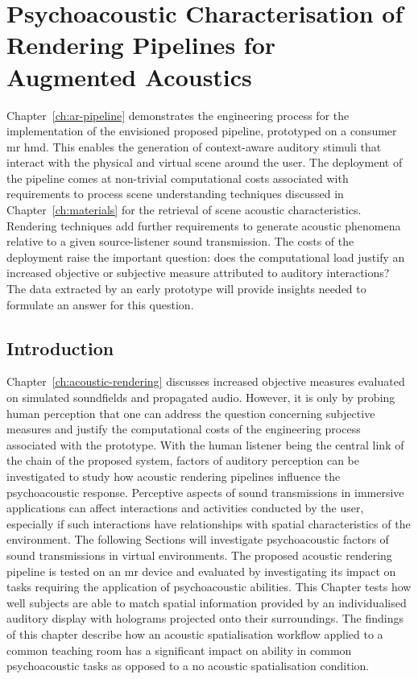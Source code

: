 \chapter{Psychoacoustic Characterisation of Rendering Pipelines for Augmented Acoustics}\label{ch:evaluation}
Chapter~\ref{ch:ar-pipeline} demonstrates the engineering process for the implementation of the envisioned proposed pipeline, prototyped on a consumer \acrshort{mr} \acrshort{hmd}. This enables the generation of context-aware auditory stimuli that interact with the physical and virtual scene around the user. The deployment of the pipeline comes at non-trivial computational costs associated with requirements to process scene understanding techniques discussed in Chapter~\ref{ch:materials} for the retrieval of scene acoustic characteristics. Rendering techniques add further requirements to generate acoustic phenomena relative to a given source-listener sound transmission. The costs of the deployment raise the important question: does the computational load justify an increased objective or subjective measure attributed to auditory interactions? The data extracted by an early prototype will provide insights needed to formulate an answer for this question.\par


\section{Introduction}
Chapter~\ref{ch:acoustic-rendering} discusses increased objective measures evaluated on simulated soundfields and propagated audio. However, it is only by probing human perception that one can address the question concerning subjective measures and justify the computational costs of the engineering process associated with the prototype. With the human listener being the central link of the chain of the proposed system, factors of auditory perception can be investigated to study how acoustic rendering pipelines influence the psychoacoustic response. Perceptive aspects of sound transmissions in immersive applications can affect interactions and activities conducted by the user, especially if such interactions have relationships with spatial characteristics of the environment. The following Sections will investigate psychoacoustic factors of sound transmissions in virtual environments. The proposed acoustic rendering pipeline is tested on an \acrshort{mr} device and evaluated by investigating its impact on tasks requiring the application of psychoacoustic abilities. This Chapter tests how well subjects are able to match spatial information provided by an individualised auditory display with holograms projected onto their surroundings. The findings of this chapter describe how an acoustic spatialisation workflow applied to a common teaching room has a significant impact on ability in common psychoacoustic tasks as opposed to a no acoustic spatialisation condition.

